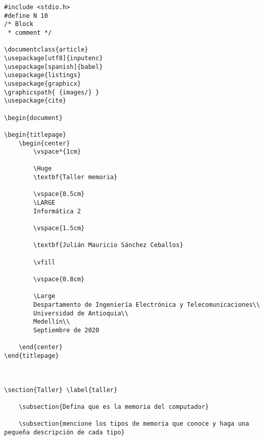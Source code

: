\documentclass{article}
\begin{document}
\begin{lstlisting}
#include <stdio.h>
#define N 10
/* Block
 * comment */

\documentclass{article}
\usepackage[utf8]{inputenc}
\usepackage[spanish]{babel}
\usepackage{listings}
\usepackage{graphicx}
\graphicspath{ {images/} }
\usepackage{cite}

\begin{document}

\begin{titlepage}
    \begin{center}
        \vspace*{1cm}
            
        \Huge
        \textbf{Taller memoria}
            
        \vspace{0.5cm}
        \LARGE
        Informática 2
            
        \vspace{1.5cm}
            
        \textbf{Julián Mauricio Sánchez Ceballos}
            
        \vfill
            
        \vspace{0.8cm}
            
        \Large
        Despartamento de Ingeniería Electrónica y Telecomunicaciones\\
        Universidad de Antioquia\\
        Medellín\\
        Septiembre de 2020
            
    \end{center}
\end{titlepage}



\section{Taller} \label{taller}

    \subsection{Defina que es la memoria del computador}
    
    \subsection{mencione los tipos de memoria que conoce y haga una pequeña descripción de cada tipo}
    

\end{lstlisting}
\end{document}
